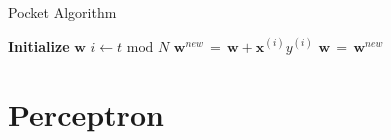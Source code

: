 \documentclass[serif, aspectratio=169]{beamer}
\begin{document}
\begin{frame}{Pocket Algorithm}
    \begin{algorithm}[H]
    \caption{Pocket Algorithm}\label{alg:Pocket Algorithm}
    \begin{algorithmic}[1]
        \State \textbf{Initialize} $\mathbf{w}$
            \State \(i \leftarrow t \text{ mod } N\)
            \State \(\mathbf{w}^{new} \, = \, \mathbf{w} + \mathbf{x}^{(i)}y^{(i)}\)
            \State \(\mathbf{w} \, = \, \mathbf{w}^{new}\)
            \EndIf
            \EndIf
        \EndFor
    \end{algorithmic}
    \end{algorithm}
\end{frame}

\section{Perceptron}
\end{document}
